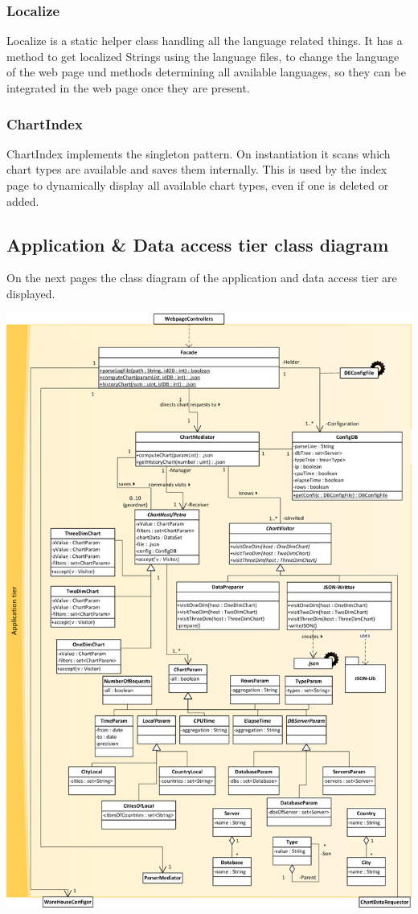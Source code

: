 \subsubsection*{Localize}
Localize is a static helper class handling all the language related things. 
It has a method to get localized Strings using the language files, 
to change the language of the web page und methods determining all available languages, 
so they can be integrated in the web page once they are present.

\subsubsection*{ChartIndex}
ChartIndex implements the singleton pattern. On instantiation it scans which chart types are available 
and saves them internally. This is used by the index page to dynamically display all available chart types,
even if one is deleted or added.

\subsection{Application \& Data access tier class diagram}
On the next pages the class diagram of the application and data access tier are displayed. 
\newpage
\begin{center}
\includegraphics[width=0.9\linewidth]{Pictures/AppTierDia1.png}
\end{center}  

